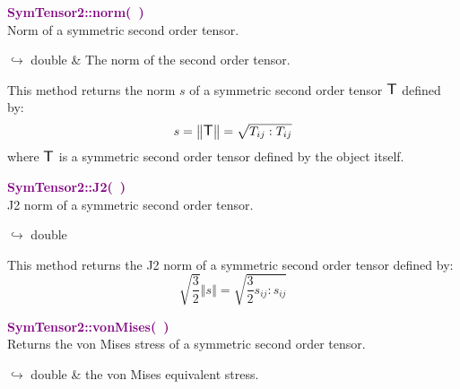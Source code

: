 \textcolor{purple}{\textbf{SymTensor2::norm(~)}}\label{SymTensor2::norm()}\\
Norm of a symmetric second order tensor.\vspace*{-0.5em}
\begin{tcolorbox}[grow to left by=-1cm, width=\textwidth-1cm,myArgs,tabularx={l|R}]
$\hookrightarrow$ double & The norm of the second order tensor.
\end{tcolorbox}

This method returns the norm $s$ of a symmetric second order tensor $\mbox{\large\ensuremath{\mathsf{T}}}$ defined by:\begin{equation*}
s = \left\Vert \mbox{\large\ensuremath{\mathsf{T}}} \right\Vert  = \sqrt {T_{ij}:T_{ij}}
\end{equation*}
where $\mbox{\large\ensuremath{\mathsf{T}}}$ is a symmetric second order tensor defined by the object itself.

\textcolor{purple}{\textbf{SymTensor2::J2(~)}}\label{SymTensor2::J2()}\\
J2 norm of a symmetric second order tensor.\vspace*{-0.5em}
\begin{tcolorbox}[grow to left by=-1cm, width=\textwidth-1cm,myArgs,tabularx={l|R}]
$\hookrightarrow$ double
\end{tcolorbox}

This method returns the J2 norm of a symmetric second order tensor defined by:
\begin{equation*}
\sqrt {\frac{3}{2}} \left\Vert s \right\Vert  = \sqrt {\frac{3}{2} s_{ij}:s_{ij}}
\end{equation*}

\textcolor{purple}{\textbf{SymTensor2::vonMises(~)}}\label{SymTensor2::vonMises()}\\
Returns the von Mises stress of a symmetric second order tensor.\vspace*{-0.5em}
\begin{tcolorbox}[grow to left by=-1cm, width=\textwidth-1cm,myArgs,tabularx={l|R}]
$\hookrightarrow$ double & the von Mises equivalent stress.
\end{tcolorbox}

